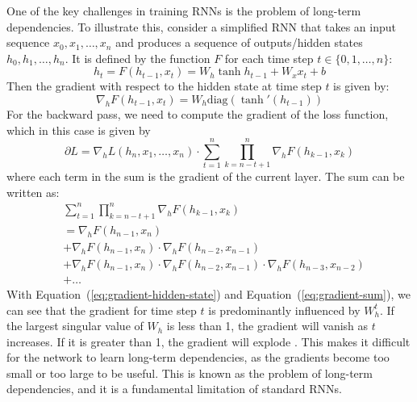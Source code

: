 \documentclass{article}
\newcommand{\refeqn}[1]{Equation~(\ref{#1})}
\begin{document}
One of the key challenges in training RNNs is the problem of long-term dependencies. To
illustrate this, consider a simplified RNN \cite{pascanuDifficultyTrainingRecurrent2013}
that takes an input sequence $x_0, x_1, \ldots, x_n$ and produces a sequence of
outputs/hidden states $h_0, h_1, \ldots, h_n$. It is defined by the function $F$ for each
time step $t \in \{0, 1, \ldots, n\}$:
\begin{equation}
  h_t = F(h_{t-1}, x_t) = W_h \tanh{h_{t-1}} + W_x x_t + b
\end{equation}
Then the gradient with respect to the hidden state at time step $t$ is given by:
\begin{equation}
  \label{eq:gradient-hidden-state}
  \nabla_h F(h_{t-1}, x_t) = W_h \text{diag}(\tanh'(h_{t-1}))
\end{equation}
For the backward pass, we need to compute the gradient of the loss function, which in
this case is given by
\begin{equation}
  \partial L = \nabla_h L(h_n, x_1, \ldots, x_n) \cdot \sum_{t=1}^{n} \prod_{k=n-t+1}^{n} \nabla_h F(h_{k-1}, x_k)
\end{equation}
where each term in the sum is the gradient of the current layer. The sum can be written
as:
\begin{align}
   & \sum_{t=1}^{n} \prod_{k=n-t+1}^{n} \nabla_h F(h_{k-1}, x_k)                                      \label{eq:gradient-sum} \\
   & = \nabla_h F(h_{n-1}, x_n)                                                                       \nonumber               \\
   & + \nabla_h F(h_{n-1}, x_n) \cdot \nabla_h F(h_{n-2}, x_{n-1})                                    \nonumber               \\
   & + \nabla_h F(h_{n-1}, x_n) \cdot \nabla_h F(h_{n-2}, x_{n-1}) \cdot \nabla_h F(h_{n-3}, x_{n-2}) \nonumber               \\
   & + \ldots \nonumber
\end{align}
With \refeqn{eq:gradient-hidden-state} and \refeqn{eq:gradient-sum}, we can see that the
gradient for time step $t$ is predominantly influenced by $W_h^t$. If the largest
singular value of $W_h$ is less than 1, the gradient will vanish as $t$ increases. If it
is greater than 1, the gradient will explode
\cite{pascanuDifficultyTrainingRecurrent2013}. This makes it difficult for the network to
learn long-term dependencies, as the gradients become too small or too large to be useful.
This is known as the problem of long-term dependencies, and it is a fundamental limitation
of standard RNNs.
\end{document}
